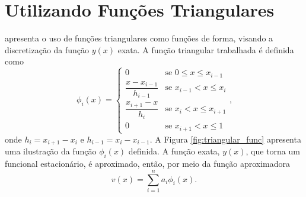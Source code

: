 \documentclass[
	12pt,				%
	openright,			%
    twoside,			%
	a4paper,			%
	english,			%
	french,				%
	spanish,			%
	brazil				%
	]{abntex2}
\numberwithin{lema}{chapter}
\numberwithin{teorema}{chapter}
\numberwithin{definicao}{chapter}
\numberwithin{exemplo}{chapter}
\numberwithin{figure}{chapter}
\begin{document}
\section{Utilizando Funções Triangulares}

 apresenta o uso de funções triangulares como funções de forma, visando a discretização da função $y(x)$ exata. A função triangular trabalhada é definida como
\begin{equation}
	\label{eqn:cap_metodo_ray_ritz:tri_func_phi}
	\phi_i (x) = 
		\begin{cases}
			0 							& \mbox{se } 0 \leqslant x \leqslant x_{i - 1}\\
			\dfrac{x-x_{i-1}}{h_{i-1}} 	& \mbox{se } x_{i-1} < x \leqslant x_i\\
			\dfrac{x_{i+1}-x}{h_i}		& \mbox{se } x_i < x \leqslant x_{i+1}\\
			0							& \mbox{se } x_{i+1}<x\leqslant 1
		\end{cases}
	\text{,}
\end{equation}
onde $h_i = x_{i+1}-x_{i}$ e $h_{i-1}=x_i-x_{i-1}$. A Figura \ref{fig:triangular_func} apresenta uma ilustração da função $\phi_i(x)$ definida. A função exata, $y(x)$, que torna um funcional estacionário, é aproximado, então, por meio da função aproximadora
\begin{equation}
	\label{eqn:cap_metodo_ray_ritz:tri_func_app_v}
	v(x)=\sum_{i=1}^{n} a_i \phi_i(x)
	\text{.}
\end{equation}
\end{document}
